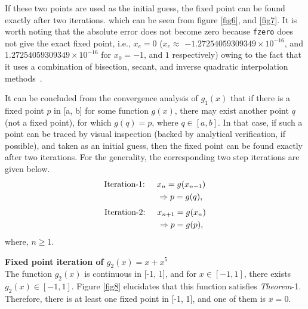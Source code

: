 \documentclass[11pt]{article} %
\begin{document}
If these two points are used as the initial guess, the fixed point can be found exactly after two iterations. which can be seen from figure \ref{fig6}, and \ref{fig7}. It is worth noting that the absolute error does not become zero because \texttt{fzero} does not give the exact fixed point, i.e., $x_e = 0$ ($x_e \approx$ $-1.27254059309349\times10^{-16}$, and $1.27254059309349\times10^{-16}$ for $x_0 = -1$, and $1$ respectively) owing to the fact that it uses a combination of bisection, secant, and inverse quadratic interpolation methods~\cite{mtlb}.

It can be concluded from the convergence analysis of $g_1(x)$ that if there is a fixed point $p$ in [a, b] for some function $g(x)$, there may exist another point $q$ (not a fixed point), for which $g(q) = p$, where $q \in [a, b]$. In that case, if such a point can be traced by visual inspection (backed by analytical verification, if possible), and taken as an initial guess, then the fixed point can be found exactly after two iterations. For the generality, the corresponding two step iterations are given below.
\begin{equation}
\begin{split}
&\text{Iteration-1:}\hspace{0.5cm}x_{n} = g(x_{n-1})\\
&\hspace{2.25cm}\Rightarrow p = g(q),
\label{eq12}
\end{split}
\end{equation}
\begin{equation}
\begin{split}
&\text{Iteration-2:}\hspace{0.5cm}x_{n+1} = g(x_{n})\\
&\hspace{2.25cm}\Rightarrow p = g(p),
\label{eq13}
\end{split}
\end{equation}
where, $n\geq1$.

\textbf{Fixed point iteration of \textbf{$g_2(x) = x + x^5$}}\\
The function $g_2(x)$ is continuous in [-1, 1], and for $x \in [-1, 1]$, there exists $g_2(x) \in [-1, 1]$. Figure \ref{fig8} elucidates that this function satisfies \textit{Theorem}-1. Therefore, there is at least one fixed point in [-1, 1], and one of them is $x = 0$.
\end{document}
